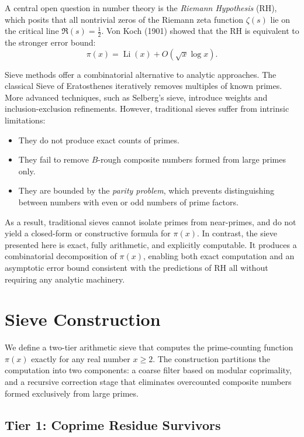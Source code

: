 \documentclass[11pt]{article}
\begin{document}
	A central open question in number theory is the \textit{Riemann Hypothesis} (RH), which posits that all nontrivial zeros of the Riemann zeta function \( \zeta(s) \) lie on the critical line \( \Re(s) = \frac{1}{2} \). Von Koch (1901) showed that the RH is equivalent to the stronger error bound:
	\[
	\pi(x) = \operatorname{Li}(x) + O\left(\sqrt{x} \log x\right).
	\]
	
	Sieve methods offer a combinatorial alternative to analytic approaches. The classical Sieve of Eratosthenes iteratively removes multiples of known primes. More advanced techniques, such as Selberg’s sieve, introduce weights and inclusion-exclusion refinements. However, traditional sieves suffer from intrinsic limitations:
	\begin{itemize}
		\item They do not produce exact counts of primes.
		\item They fail to remove $B$-rough composite numbers formed from large primes only.
		\item They are bounded by the \emph{parity problem}, which prevents distinguishing between numbers with even or odd numbers of prime factors.
	\end{itemize}
	
	As a result, traditional sieves cannot isolate primes from near-primes, and do not yield a closed-form or constructive formula for \( \pi(x) \). In contrast, the sieve presented here is exact, fully arithmetic, and explicitly computable. It produces a combinatorial decomposition of \( \pi(x) \), enabling both exact computation and an asymptotic error bound consistent with the predictions of RH all without requiring any analytic machinery.

		
	
	\section{Sieve Construction}
	
	We define a two-tier arithmetic sieve that computes the prime-counting function \( \pi(x) \) exactly for any real number \( x \geq 2 \). The construction partitions the computation into two components: a coarse filter based on modular coprimality, and a recursive correction stage that eliminates overcounted composite numbers formed exclusively from large primes.
	
	\subsection{Tier 1: Coprime Residue Survivors}
	
\end{document}
